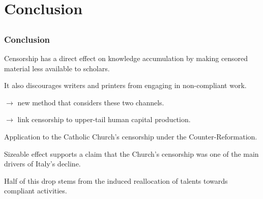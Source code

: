 \documentclass[usepdftitle=false,aspectratio=169,xcolor=dvipsnames]{beamer}
\begin{document}
	\section{Conclusion}
	\subsection{}

	\begin{frame}
\frametitle{Conclusion}


Censorship has a direct effect on knowledge accumulation by making censored material less available to scholars.

 It also discourages writers and printers from engaging in non-compliant work.

$\rightarrow$ new method that considers these two channels.

$\rightarrow$ link  censorship to upper-tail human capital production.

Application to the Catholic Church's censorship under the Counter-Reformation.

Sizeable effect  supports a claim that the Church's censorship was one of the main drivers of Italy's decline.

  Half of this drop stems from the induced reallocation of talents towards compliant activities.

\end{frame}
\end{document}
